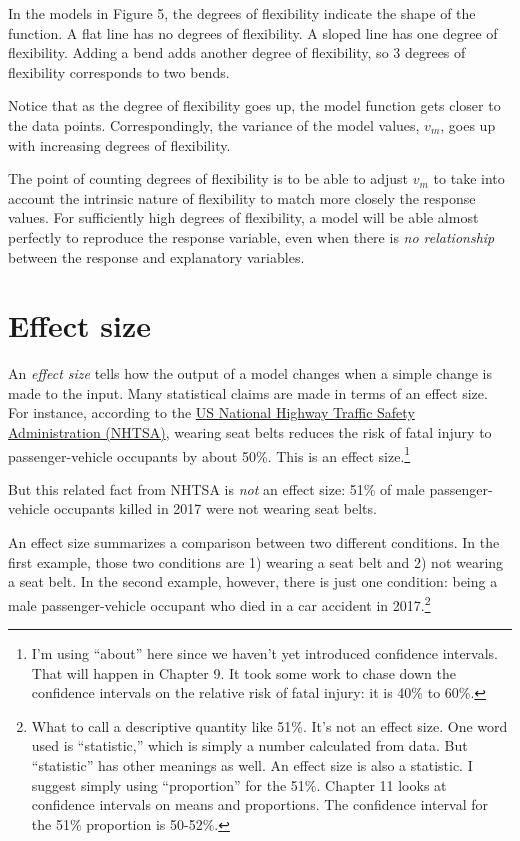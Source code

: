 \documentclass[]{tufte-book}
\begin{document}
In the models in Figure 5, the degrees of flexibility indicate the shape of the function. A flat line has no degrees of flexibility. A sloped line has one degree of flexibility. Adding a bend adds another degree of flexibility, so 3 degrees of flexibility corresponds to two bends.

Notice that as the degree of flexibility goes up, the model function gets closer to the data points. Correspondingly, the variance of the model values, \(v_m\), goes up with increasing degrees of flexibility.

The point of counting degrees of flexibility is to be able to adjust \(v_m\) to take into account the intrinsic nature of flexibility to match more closely the response values. For sufficiently high degrees of flexibility, a model will be able almost perfectly to reproduce the response variable, even when there is \emph{no relationship} between the response and explanatory variables.

\hypertarget{effect-size}{%
\chapter{Effect size}\label{effect-size}}

An \emph{effect size} tells how the output of a model changes when a simple change is made to the input. Many statistical claims are made in terms of an effect size. For instance, according to the \href{https://www.nhtsa.gov/risky-driving/seat-belts}{US National Highway Traffic Safety Administration (NHTSA)}, wearing seat belts reduces the risk of fatal injury to passenger-vehicle occupants by about 50\%. This is an effect size.\footnote{I'm using ``about'' here since we haven't yet introduced confidence intervals. That will happen in Chapter 9. It took some work to chase down the confidence intervals on the relative risk of fatal injury: it is 40\% to 60\%.}

But this related fact from NHTSA is \emph{not} an effect size: 51\% of male passenger-vehicle occupants killed in 2017 were not wearing seat belts.

An effect size summarizes a comparison between two different conditions. In the first example, those two conditions are 1) wearing a seat belt and 2) not wearing a seat belt. In the second example, however, there is just one condition: being a male passenger-vehicle occupant who died in a car accident in 2017.\footnote{What to call a descriptive quantity like 51\%. It's not an effect size. One word used is ``statistic,'' which is simply a number calculated from data. But ``statistic'' has other meanings as well. An effect size is also a statistic. I suggest simply using ``proportion'' for the 51\%. Chapter 11 looks at confidence intervals on means and proportions. The confidence interval for the 51\% proportion is 50-52\%.}
\end{document}
